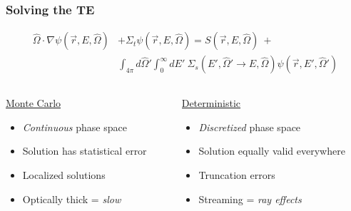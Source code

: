 \documentclass[xcolor=x11names,compress,handout]{beamer}
\renewcommand{\(}{\begin{columns}}
\renewcommand{\)}{\end{columns}}
\newcommand{\<}[1]{\begin{column}{#1}}
\renewcommand{\>}{\end{column}}
\newcommand{\vOmega}{\ensuremath{\hat{\Omega}}}
\begin{document}
\begin{frame}[fragile]
  \frametitle{Solving the TE}
  \begin{align}
\vOmega \cdot \nabla \psi(\vec{r}, E, \vOmega) &+
\Sigma_t \psi(\vec{r}, E, \vOmega) = S(\vec{r}, E, \vOmega) \:+\nonumber\\
%
& \int_{4\pi} d\vOmega' \int_0^{\infty} dE'\: \Sigma_s(E', \vOmega' \rightarrow E, \vOmega) \psi(\vec{r}, E', \vOmega') \nonumber
\end{align}
%
\begin{columns}
  \begin{column}{0.5\textwidth}
  \begin{center}
  \underline{Monte Carlo}
  \end{center}
  \vspace*{-1em}
	\begin{itemize}
	\item \textit{Continuous} phase space%
	\item Solution has statistical error
	\item Localized solutions
	\item Optically thick = \textit{slow}
	\end{itemize}
  \end{column}
  \begin{column}{0.5\textwidth}
  \begin{center}
  \underline{Deterministic}
  \end{center}
  \vspace*{-1em}
	\begin{itemize}
	\item \textit{Discretized} phase space%
	\item Solution equally valid everywhere
	\item Truncation errors
	\item Streaming = \textit{ray effects}
	\end{itemize}
  \end{column}
\end{columns}

\end{frame}
\end{document}
